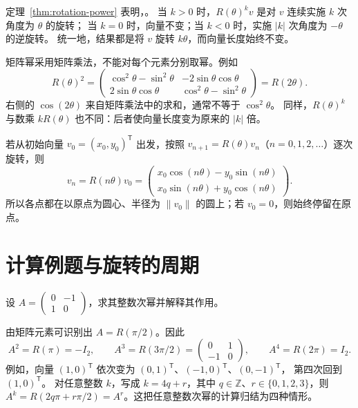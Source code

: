 \documentclass[UTF8,12pt,a4paper,fontset=fandol]{ctexart}
\begin{document}
定理~\ref{thm:rotation-power} 表明，。
当 $k>0$ 时，$R(\theta)^kv$ 是对 $v$ 连续实施 $k$ 次角度为 $\theta$ 的旋转；
当 $k=0$ 时，向量不变；当 $k<0$ 时，实施 $|k|$ 次角度为 $-\theta$ 的逆旋转。
统一地，结果都是将 $v$ 旋转 $k\theta$，而向量长度始终不变。

矩阵幂采用矩阵乘法，不能对每个元素分别取幂。例如
\[
  R(\theta)^2
  =\begin{pmatrix}
    \cos^2\theta-\sin^2\theta&-2\sin\theta\cos\theta\\
    2\sin\theta\cos\theta&\cos^2\theta-\sin^2\theta
  \end{pmatrix}
  =R(2\theta).
\]
右侧的 $\cos(2\theta)$ 来自矩阵乘法中的求和，通常不等于 $\cos^2\theta$。
同样，$R(\theta)^k$ 与数乘 $kR(\theta)$ 也不同：后者使向量长度变为原来的 $|k|$ 倍。

若从初始向量 $v_0=(x_0,y_0)^{\mathsf T}$ 出发，按照
$v_{n+1}=R(\theta)v_n$（$n=0,1,2,\ldots$）逐次旋转，则
\begin{equation}
  v_n=R(n\theta)v_0
  =\begin{pmatrix}
    x_0\cos(n\theta)-y_0\sin(n\theta)\\
    x_0\sin(n\theta)+y_0\cos(n\theta)
  \end{pmatrix}.
  \label{eq:rotation-orbit}
\end{equation}
所以各点都在以原点为圆心、半径为 $\|v_0\|$ 的圆上；若 $v_0=0$，则始终停留在原点。

\section{计算例题与旋转的周期}

\begin{example}[逆时针旋转直角]
设 $A=\begin{pmatrix}0&-1\\1&0\end{pmatrix}$，求其整数次幂并解释其作用。
\end{example}

\begin{solve}
由矩阵元素可识别出 $A=R(\pi/2)$。因此
\[
  A^2=R(\pi)=-I_2,\qquad
  A^3=R(3\pi/2)=\begin{pmatrix}0&1\\-1&0\end{pmatrix},\qquad
  A^4=R(2\pi)=I_2.
\]
例如，向量 $(1,0)^{\mathsf T}$ 依次变为
$(0,1)^{\mathsf T}$、$(-1,0)^{\mathsf T}$、$(0,-1)^{\mathsf T}$，
第四次回到 $(1,0)^{\mathsf T}$。
对任意整数 $k$，写成 $k=4q+r$，其中 $q\in\mathbb Z$、$r\in\{0,1,2,3\}$，则
$A^k=R(2q\pi+r\pi/2)=A^r$。这把任意整数次幂的计算归结为四种情形。
\end{solve}
\end{document}
